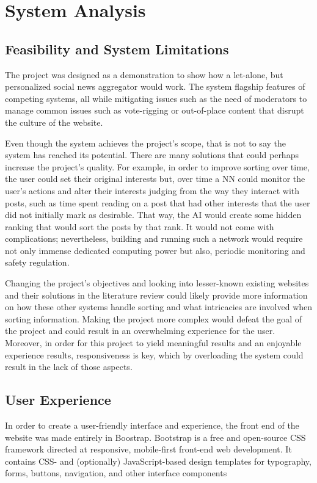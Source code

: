 
\chapter{System Analysis}

\section{Feasibility and System Limitations}
The project was designed as a demonstration to show how a let-alone, but personalized social news aggregator would work. The system flagship features of competing systems, all while mitigating issues such as the need of moderators to manage common issues such as vote-rigging or out-of-place content that disrupt the culture of the website.

Even though the system achieves the project's scope, that is not to say the system has reached its potential. There are many solutions that could perhaps increase the project's quality. For example, in order to improve sorting over time, the user could set their original interests but, over time a NN could monitor the user's actions and alter their interests judging from the way they interact with posts, such as time spent reading on a post that had other interests that the user did not initially mark as desirable. That way, the AI would create some hidden ranking that would sort the posts by that rank. It would not come with complications; nevertheless, building and running such a network would require not only immense dedicated computing power but also, periodic monitoring and safety regulation.

Changing the project's objectives and looking into lesser-known existing websites and their solutions in the literature review could likely provide more information on how these other systems handle sorting and what intricacies are involved when sorting information. Making the project more complex would defeat the goal of the project and could result in an overwhelming experience for the user. Moreover, in order for this project to yield meaningful results and an enjoyable experience results, responsiveness is key, which by overloading the system could result in the lack of those aspects.

\section{User Experience}
In order to create a user-friendly interface and experience, the front end of the website was made entirely in Boostrap. Bootstrap is a free and open-source CSS framework directed at responsive, mobile-first front-end web development. It contains CSS- and (optionally) JavaScript-based design templates for typography, forms, buttons, navigation, and other interface components

